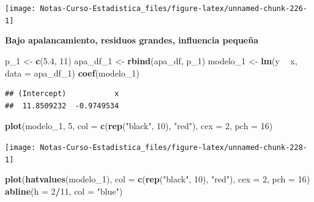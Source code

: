 \documentclass[
  12pt,
]{book}
\newenvironment{Shaded}{\begin{snugshade}}{\end{snugshade}}
\newcommand{\DataTypeTok}[1]{\textcolor[rgb]{0.13,0.29,0.53}{#1}}
\newcommand{\DecValTok}[1]{\textcolor[rgb]{0.00,0.00,0.81}{#1}}
\newcommand{\FloatTok}[1]{\textcolor[rgb]{0.00,0.00,0.81}{#1}}
\newcommand{\KeywordTok}[1]{\textcolor[rgb]{0.13,0.29,0.53}{\textbf{#1}}}
\newcommand{\NormalTok}[1]{#1}
\newcommand{\OperatorTok}[1]{\textcolor[rgb]{0.81,0.36,0.00}{\textbf{#1}}}
\newcommand{\StringTok}[1]{\textcolor[rgb]{0.31,0.60,0.02}{#1}}
\theoremstyle{definition}
\theoremstyle{definition}
\theoremstyle{definition}
\theoremstyle{remark}
\begin{document}
\begin{center}\texttt{[image: Notas-Curso-Estadistica\_files/figure-latex/unnamed-chunk-226-1]} \end{center}

\textbf{Bajo apalancamiento, residuos grandes, influencia pequeña}

\begin{Shaded}
\begin{Highlighting}[]
\NormalTok{p_}\DecValTok{1}\NormalTok{ <-}\StringTok{ }\KeywordTok{c}\NormalTok{(}\FloatTok{5.4}\NormalTok{, }\DecValTok{11}\NormalTok{)}
\NormalTok{apa_df_}\DecValTok{1}\NormalTok{ <-}\StringTok{ }\KeywordTok{rbind}\NormalTok{(apa_df, p_}\DecValTok{1}\NormalTok{)}
\NormalTok{modelo_}\DecValTok{1}\NormalTok{ <-}\StringTok{ }\KeywordTok{lm}\NormalTok{(y }\OperatorTok{~}\StringTok{ }\NormalTok{x, }\DataTypeTok{data =}\NormalTok{ apa_df_}\DecValTok{1}\NormalTok{)}
\KeywordTok{coef}\NormalTok{(modelo_}\DecValTok{1}\NormalTok{)}
\end{Highlighting}
\end{Shaded}

\begin{verbatim}
## (Intercept)           x 
##  11.8509232  -0.9749534
\end{verbatim}

\begin{Shaded}
\begin{Highlighting}[]
\KeywordTok{plot}\NormalTok{(modelo_}\DecValTok{1}\NormalTok{, }\DecValTok{5}\NormalTok{, }\DataTypeTok{col =} \KeywordTok{c}\NormalTok{(}\KeywordTok{rep}\NormalTok{(}\StringTok{"black"}\NormalTok{, }\DecValTok{10}\NormalTok{), }\StringTok{"red"}\NormalTok{), }
    \DataTypeTok{cex =} \DecValTok{2}\NormalTok{, }\DataTypeTok{pch =} \DecValTok{16}\NormalTok{)}
\end{Highlighting}
\end{Shaded}

\begin{center}\texttt{[image: Notas-Curso-Estadistica\_files/figure-latex/unnamed-chunk-228-1]} \end{center}

\begin{Shaded}
\begin{Highlighting}[]
\KeywordTok{plot}\NormalTok{(}\KeywordTok{hatvalues}\NormalTok{(modelo_}\DecValTok{1}\NormalTok{), }\DataTypeTok{col =} \KeywordTok{c}\NormalTok{(}\KeywordTok{rep}\NormalTok{(}\StringTok{"black"}\NormalTok{, }\DecValTok{10}\NormalTok{), }
    \StringTok{"red"}\NormalTok{), }\DataTypeTok{cex =} \DecValTok{2}\NormalTok{, }\DataTypeTok{pch =} \DecValTok{16}\NormalTok{)}
\KeywordTok{abline}\NormalTok{(}\DataTypeTok{h =} \DecValTok{2}\OperatorTok{/}\DecValTok{11}\NormalTok{, }\DataTypeTok{col =} \StringTok{"blue"}\NormalTok{)}
\end{Highlighting}
\end{Shaded}
\end{document}
